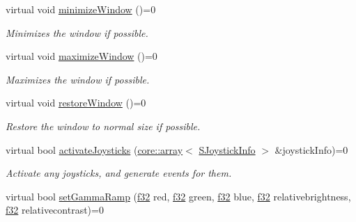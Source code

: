 \begin{DoxyCompactItemize}
\mbox{\label{classirr_1_1IrrlichtDevice_a23e31ff31f564d5e715edc901e519311}} 
virtual void \hyperlink{classirr_1_1IrrlichtDevice_a23e31ff31f564d5e715edc901e519311}{minimize\+Window} ()=0
\begin{DoxyCompactList}\small\item\em Minimizes the window if possible. \end{DoxyCompactList}\item 
\mbox{\label{classirr_1_1IrrlichtDevice_a24cb8ac97c16114ff7df1f0ec604a219}} 
virtual void \hyperlink{classirr_1_1IrrlichtDevice_a24cb8ac97c16114ff7df1f0ec604a219}{maximize\+Window} ()=0
\begin{DoxyCompactList}\small\item\em Maximizes the window if possible. \end{DoxyCompactList}\item 
\mbox{\label{classirr_1_1IrrlichtDevice_a4a92974b424cc612198505e31fe125d3}} 
virtual void \hyperlink{classirr_1_1IrrlichtDevice_a4a92974b424cc612198505e31fe125d3}{restore\+Window} ()=0
\begin{DoxyCompactList}\small\item\em Restore the window to normal size if possible. \end{DoxyCompactList}\item 
virtual bool \hyperlink{classirr_1_1IrrlichtDevice_af06f8d2c4fdffd1f879e46685bcbc6e3}{activate\+Joysticks} (\hyperlink{classirr_1_1core_1_1array}{core\+::array}$<$ \hyperlink{structirr_1_1SJoystickInfo}{S\+Joystick\+Info} $>$ \&joystick\+Info)=0
\begin{DoxyCompactList}\small\item\em Activate any joysticks, and generate events for them. \end{DoxyCompactList}\item 
\mbox{\label{classirr_1_1IrrlichtDevice_aaa6cec87ca0a18ec369ea12f7fbd490c}} 
virtual bool \hyperlink{classirr_1_1IrrlichtDevice_aaa6cec87ca0a18ec369ea12f7fbd490c}{set\+Gamma\+Ramp} (\hyperlink{namespaceirr_a0277be98d67dc26ff93b1a6a1d086b07}{f32} red, \hyperlink{namespaceirr_a0277be98d67dc26ff93b1a6a1d086b07}{f32} green, \hyperlink{namespaceirr_a0277be98d67dc26ff93b1a6a1d086b07}{f32} blue, \hyperlink{namespaceirr_a0277be98d67dc26ff93b1a6a1d086b07}{f32} relativebrightness, \hyperlink{namespaceirr_a0277be98d67dc26ff93b1a6a1d086b07}{f32} relativecontrast)=0

\end{DoxyCompactItemize}

